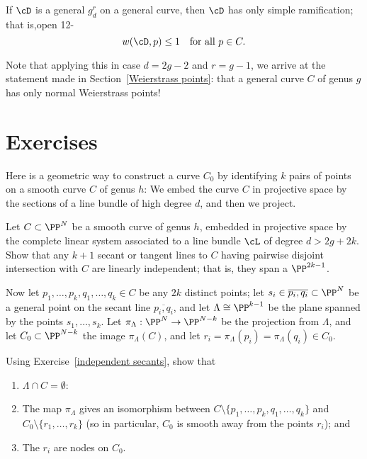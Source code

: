 \begin{theorem}
If $\cD$ is a general $g^r_d$ on a general curve, then $\cD$ has only simple ramification; that is,open 12-	
$$
w(\cD, p) \leq 1 \quad \text{for all } p \in C.
$$
\end{theorem}

Note that applying this in case $d=2g-2$ and $r = g-1$, we arrive at the statement made in Section~\ref{Weierstrass points}: that a general curve $C$ of genus $g$ has only normal Weierstrass points!

\section{Exercises}


Here is a geometric way to construct a curve $C_0$ by identifying $k$ pairs of points on a smooth curve $C$ of genus $h$: We embed the curve $C$ in projective space by the sections of a line bundle of high degree $d$, and then we project.

\begin{exercise}\label{independent secants} Let $C \subset \PP^N$ be a smooth curve of genus $h$, embedded in projective space by the complete linear system associated to a line bundle $\cL$ of degree $d > 2g + 2k$. Show that any $k+1$ secant or tangent lines to $C$  having pairwise disjoint intersection with $C$ are linearly independent; that is, they span a $\PP^{2k-1}$.
\end{exercise}

Now let $p_1,\dots,p_k, q_1,\dots, q_k \in C$ be any $2k$ distinct points; let $s_i \in \overline{p_i,q_i} \subset \PP^N$ be a general point on the secant line $\overline{p_i,q_i} $, and let $\Lambda \cong \PP^{k-1}$ be the plane spanned by the points $s_1,\dots,s_k$. Let $\pi_\Lambda : \PP^N \to \PP^{N-k}$ be the projection from $\Lambda$, and let $C_0 \subset \PP^{N-k}$ the image $\pi_\Lambda(C)$, and let $r_i = \pi_\Lambda(p_i) = \pi_\Lambda(q_i) \in C_0$.

\begin{exercise}\label{construction of nodal curves}
Using Exercise~\ref{independent secants}, show that 
\begin{enumerate}
\item $\Lambda \cap C = \emptyset$:
\item The map $\pi_\Lambda$ gives an isomorphism between $C \setminus \{p_1,\dots,p_k, q_1,\dots, q_k\}$ and $C_0 \setminus \{r_1,\dots,r_k\}$ (so in particular, $C_0$ is smooth away from the points $r_i$); and
\item The $r_i$ are nodes on $C_0$.
\end{enumerate}
\end{exercise}

